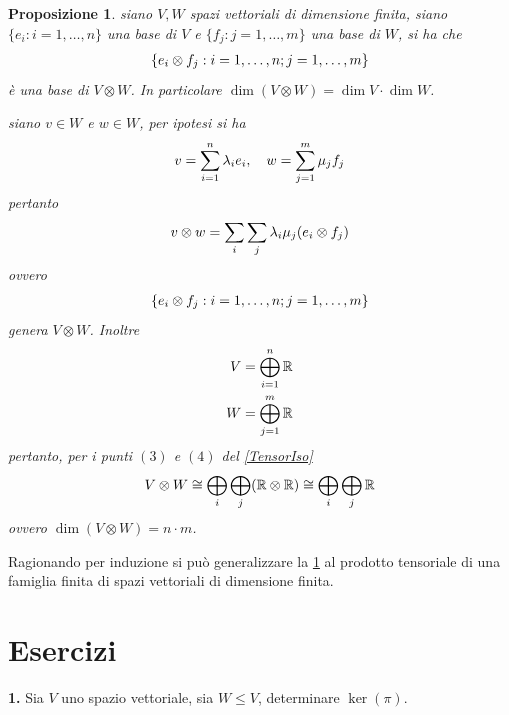 \documentclass[oneside, 11pt]{amsbook}
\makeatletter
\newcommand{\0}{{(0)}}
\newcommand{\3}{{(3)}}
\theoremstyle{colonplain}
\newtheorem{prop}[thm]{Proposizione}
\theoremstyle{colondefinition}
\theoremstyle{colonremark}
\numberwithin{equation}{chapter}
\renewcommand{\proofname}{Dimostrazione}
\renewenvironment{proof}[1][\proofname]{\par
  \pushQED{\qed}%
  \normalfont \topsep6\p@\@plus6\p@\relax
  \trivlist
  \item[\hskip\labelsep\bfseries #1:]\ignorespaces
}{%
  \popQED\endtrivlist\@endpefalse
}
\makeatother
\begin{document}
\begin{prop}\label{TensorBasis} siano $V, W$ spazi vettoriali di dimensione finita, siano $\{ e_i : i = 1, \dots, n \}$ una base di $V$ e $\{ f_j : j = 1, \dots, m \}$ una base di $W$, si ha che
\begin{align}
    \{ e_i \otimes f_j : i = 1, \dots, n; j = 1, \dots, m \} \notag
\end{align}
è una base di $V \otimes W$. In particolare $\dim (V \otimes W) = \dim V \cdot \dim W$. \\

\begin{proof} siano $v \in W$ e $w \in W$, per ipotesi si ha
\begin{align}
    v = \sum_{i = 1}^n \lambda_i e_i, \quad w = \sum_{j = 1}^m \mu_j f_j \notag
\end{align}
pertanto
\begin{align}
    v \otimes w = \sum_i \sum_j \lambda_i \mu_j  (e_i \otimes f_j) \notag
\end{align}
ovvero
\begin{align}
    \{ e_i \otimes f_j : i = 1, \dots, n; j = 1, \dots, m \} \notag
\end{align}
genera $V \otimes W$. Inoltre
\begin{align}
    V = \bigoplus_{i = 1}^n \mathbb{R} \notag \\
    W = \bigoplus_{j = 1}^m \mathbb{R} \notag
\end{align}
pertanto, per i punti $(3)$ e $(4)$ del \cref{TensorIso}
\begin{align}
    V \otimes W \cong \bigoplus_i \bigoplus_j (\mathbb{R} \otimes \mathbb{R}) \cong \bigoplus_i \bigoplus_j \mathbb{R} \notag
\end{align}
ovvero $\dim (V \otimes W) = n \cdot m$. \end{proof}
\end{prop}
Ragionando per induzione si può generalizzare la \cref{TensorBasis} al prodotto tensoriale di una famiglia finita di spazi vettoriali di dimensione finita.

\section{Esercizi}
\textbf{1.} Sia $V$ uno spazio vettoriale, sia $W \leq V$, determinare $\ker (\pi)$. \\
\end{document}
